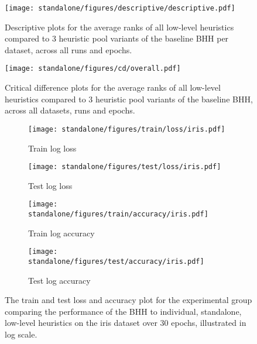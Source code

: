 \begin{figure}[htbp]
	\centering
	\texttt{[image: standalone/figures/descriptive/descriptive.pdf]}
	\caption{Descriptive plots for the average ranks of all low-level heuristics compared to 3 heuristic pool variants of the baseline \Acs{BHH} per dataset, across all runs and epochs.}
	\label{fig:results:standalone:descriptive:descriptive}
\end{figure}


\begin{figure}[htbp]
	\centering
	\texttt{[image: standalone/figures/cd/overall.pdf]}
	\caption{Critical difference plots for the average ranks of all low-level heuristics compared to 3 heuristic pool variants of the baseline \acs{BHH}, across all datasets, runs and epochs.}
	\label{fig:results:standalone:descriptive:cd}
\end{figure}



\begin{figure}[htbp]
	\begin{subfigure}{0.5\textwidth}
		\centering
		\texttt{[image: standalone/figures/train/loss/iris.pdf]}
		\caption{Train log loss}
		\label{fig:results:standalone:figures:loss:train:iris}
	\end{subfigure}
	\begin{subfigure}{0.5\textwidth}
		\centering
		\texttt{[image: standalone/figures/test/loss/iris.pdf]}
		\caption{Test log loss}
		\label{fig:results:standalone:figures:loss:test:iris}
	\end{subfigure}
	\par\bigskip
	\begin{subfigure}{0.5\textwidth}
		\centering
		\texttt{[image: standalone/figures/train/accuracy/iris.pdf]}
		\caption{Train log accuracy}
		\label{fig:results:standalone:figures:accuracy:train:iris}
	\end{subfigure}
	\begin{subfigure}{0.5\textwidth}
		\centering
		\texttt{[image: standalone/figures/test/accuracy/iris.pdf]}
		\caption{Test log accuracy}
		\label{fig:results:standalone:figures:accuracy:test:iris}
	\end{subfigure}
	\par\bigskip
	\caption{The train and test loss and accuracy plot for the experimental group comparing the performance of the \acs{BHH} to individual, standalone, low-level heuristics on the iris dataset over 30 epochs, illustrated in log scale.}
	\label{fig:results:standalone:figures:iris}
\end{figure}

